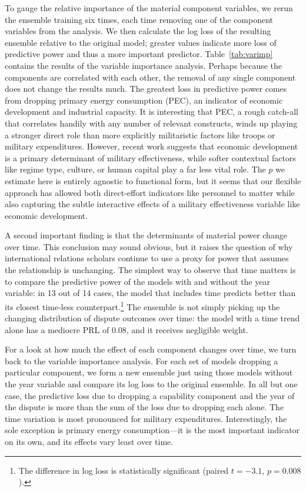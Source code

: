 To gauge the relative importance of the material component variables, we rerun the ensemble training six times, each time removing one of the component variables from the analysis.
We then calculate the log loss of the resulting ensemble relative to the original model; greater values indicate more loss of predictive power and thus a more important predictor.
Table~\ref{tab:varimp} contains the results of the variable importance analysis.
Perhaps because the components are correlated with each other, the removal of any single component does not change the results much.
The greatest loss in predictive power comes from dropping primary energy consumption (PEC), an indicator of economic development and industrial capacity.
It is interesting that PEC, a rough catch-all that correlates handily with any number of relevant constructs, winds up playing a stronger direct role than more explicitly militaristic factors like troops or military expenditures.
However, recent work \citep[e.g.][]{beckley2010economic} suggests that economic development is a primary determinant of military effectiveness, while softer contextual factors like regime type, culture, or human capital play a far less vital role.
The $p$ we estimate here is entirely agnostic to functional form, but it seems that our flexible approach has allowed both direct-effort indicators like personnel to matter while also capturing the subtle interactive effects of a military effectiveness variable like economic development.

A second important finding is that the determinants of material power change over time.
This conclusion may sound obvious, but it raises the question of why international relations scholars continue to use a proxy for power that assumes the relationship is unchanging.
The simplest way to observe that time matters is to compare the predictive power of the models with and without the year variable: in 13 out of 14 cases, the model that includes time predicts better than its closest time-less counterpart.\footnote{%
  The difference in log loss is statistically significant (paired $t = -3.1$, $p = 0.008$).
}
The ensemble is not simply picking up the changing distribution of dispute outcomes over time: the model with a time trend alone has a mediocre PRL of 0.08, and it receives negligible weight.

For a look at how much the effect of each component changes over time, we turn back to the variable importance analysis.
For each set of models dropping a particular component, we form a new ensemble just using those models without the year variable and compare its log loss to the original ensemble.
In all but one case, the predictive loss due to dropping a capability component and the year of the dispute is more than the sum of the loss due to dropping each alone.
The time variation is most pronounced for military expenditures.
Interestingly, the sole exception is primary energy consumption---it is the most important indicator on its own, and its effects vary least over time.

